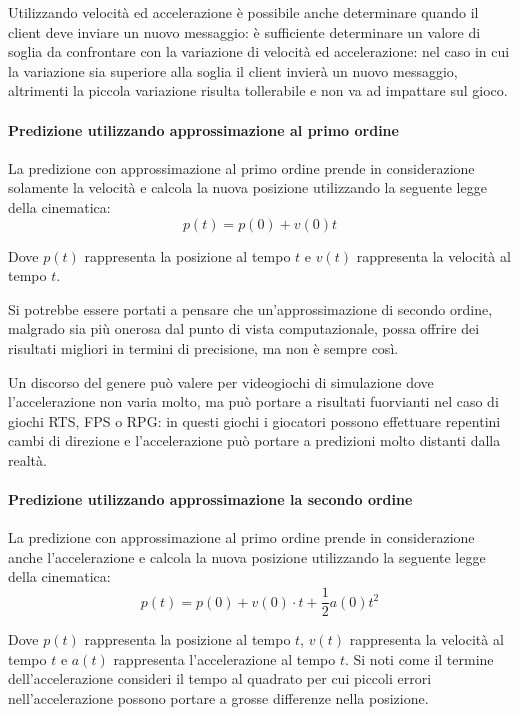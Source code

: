\documentclass[a4paper,11pt]{article}
\begin{document}
Utilizzando velocit\`a ed accelerazione \`e possibile anche determinare quando il client deve inviare un nuovo messaggio: \`e sufficiente determinare un valore di soglia da confrontare con la variazione di velocit\`a ed accelerazione: nel caso in cui la variazione sia superiore alla soglia il client invier\`a un nuovo messaggio, altrimenti la piccola variazione risulta tollerabile e non va ad impattare sul gioco.



\paragraph{Predizione utilizzando approssimazione al primo ordine}

La predizione con approssimazione al primo ordine prende in considerazione solamente la velocit\`a e calcola la nuova posizione utilizzando la seguente legge della cinematica: $$ p(t) = p(0) + v(0) t$$

Dove $p(t)$ rappresenta la posizione al tempo $t$ e $v(t)$ rappresenta la velocit\`a al tempo $t$.

Si potrebbe essere portati a pensare che un'approssimazione di secondo ordine, malgrado sia pi\`u onerosa dal punto di vista computazionale, possa offrire dei risultati migliori in termini di precisione, ma non \`e sempre cos\`i.

Un discorso del genere pu\`o valere per videogiochi di simulazione dove l'accelerazione non varia molto, ma pu\`o portare a risultati fuorvianti nel caso di giochi RTS, FPS o RPG: in questi giochi i giocatori possono effettuare repentini cambi di direzione e l'accelerazione pu\`o portare a predizioni molto distanti dalla realt\`a. 

\paragraph{Predizione utilizzando approssimazione la secondo ordine}

La predizione con approssimazione al primo ordine prende in considerazione anche l'accelerazione e calcola la nuova posizione utilizzando la seguente legge della cinematica: $$ p(t) = p(0) + v(0)\cdot t + \frac{1}{2} a(0) t^2 $$

Dove $p(t)$ rappresenta la posizione al tempo $t$, $v(t)$ rappresenta la velocit\`a al tempo $t$ e $a(t)$ rappresenta l'accelerazione al tempo $t$. Si noti come il termine dell'accelerazione consideri il tempo al quadrato per cui piccoli errori nell'accelerazione possono portare a grosse differenze nella posizione.
\end{document}
